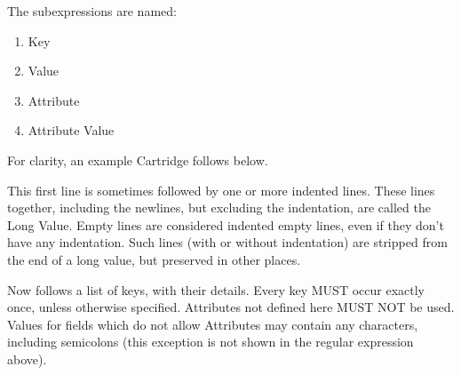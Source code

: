 \documentclass{article}
\begin{document}
The subexpressions are named:
\begin{enumerate}
	\item Key
	\item Value
	\item Attribute
	\item Attribute Value
\end{enumerate}

For clarity, an example Cartridge follows below.

This first line is sometimes followed by one or more indented lines. These
lines together, including the newlines, but excluding the indentation, are
called the Long Value. Empty lines are considered indented empty lines, even if
they don't have any indentation.  Such lines (with or without indentation) are
stripped from the end of a long value, but preserved in other places.

Now follows a list of keys, with their details. Every key MUST occur exactly
once, unless otherwise specified. Attributes not defined here MUST NOT be
used. Values for fields which do not allow Attributes may contain any
characters, including semicolons (this exception is not shown in the regular
expression above).
\end{document}
